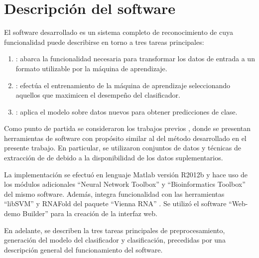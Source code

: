 %
%
%
%
\chapter{Descripción del software}
%
El software desarrollado es un sistema completo de reconocimiento de
 cuya funcionalidad puede describirse en torno a tres
tareas principales:
%
\begin{enumerate}
\item {}: abarca la funcionalidad necesaria para
  transformar los datos de entrada a un formato utilizable por la
  máquina de aprendizaje.
\item {}: efectúa el
  entrenamiento de la máquina de aprendizaje seleccionando
  aquellos  que maximicen el desempeño del clasificador.
\item {}: aplica el modelo sobre datos
  nuevos para obtener predicciones de clase.
\end{enumerate}
%
Como punto de partida se consideraron los trabajos previos
\cite{xue,ng,batuwita,sheng,sewer,ding}, donde se presentan
herramientas de software con propósito similar al del método
desarrollado en el presente trabajo. En particular, se utilizaron
conjuntos de datos y técnicas de extracción de  de
\cite{xue,ng,batuwita} debido a la disponibilidad de los datos
suplementarios.

La implementación se efectuó en lenguaje Matlab versión R2012b y hace
uso de los módulos adicionales ``Neural Network Toolbox'' y
``Bioinformatics Toolbox'' del mismo software. Además, integra
funcionalidad con las herramientas ``libSVM'' \cite{libsvm} y RNAFold
del paquete ``Vienna RNA'' \cite{vienna}. Se utilizó el software
``Web-demo Builder''\cite{webdemobuilder} para la creación de la
interfaz web.

En adelante, se describen la tres tareas principales de
preprocesamiento, generación del modelo del clasificador y
clasificación, precedidas por una descripción general del
funcionamiento del software.
